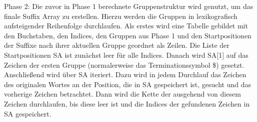 Phase 2: Die zuvor in Phase 1 berechnete Gruppenstruktur wird genutzt, um das finale Suffix Array zu erstellen. Hierzu werden die Gruppen in lexikografisch aufsteigender Reihenfolge durchlaufen.
Als erstes wird eine Tabelle gebildet mit den Buchstaben, den Indices, den Gruppen aus Phase 1 und den Startpositionen der Suffixe nach ihrer aktuellen Gruppe geordnet als Zeilen. Die Liste der Startpositionen SA ist zun{\"a}chst leer f{\"u}r alle Indices.
Danach wird SA[1] auf das Zeichen der ersten Gruppe (normalerweise das Terminationssymbol \$) gesetzt.
Anschlie{\ss}end wird {\"u}ber SA iteriert. Dazu wird in jedem Durchlauf das Zeichen des originalen Wortes an der Position, die in SA gespeichert ist, gesucht und das vorherige Zeichen betrachtet. Dann wird die Kette der \prevpointer ausgehend von diesem Zeichen durchlaufen, bis diese leer ist und die Indices der gefundenen Zeichen in SA gespeichert. 